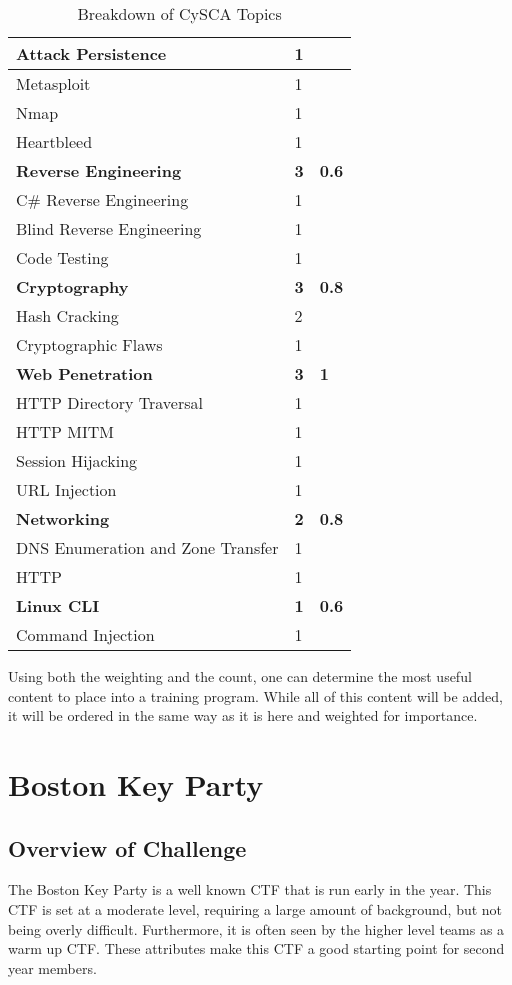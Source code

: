 \documentclass[a4paper,11pt]{report}
\begin{document}
\begin{table}[htb]
\begin{tabular}{| l | l | l |}
				\quad Attack Persistence & 1 & \\ \hline 
				\quad Metasploit & 1 & \\ \hline 
				\quad Nmap & 1 & \\ \hline 
				\quad Heartbleed & 1 & \\ \hline
				\textbf{Reverse Engineering} & \textbf{3} & \textbf{0.6}\\ \hline 
				\quad C\# Reverse Engineering & 1 & \\ \hline
				\quad Blind Reverse Engineering & 1 & \\ \hline 
				\quad Code Testing & 1 & \\ \hline 
				\textbf{Cryptography} & \textbf{3} & \textbf{0.8} \\ \hline 
				\quad Hash Cracking & 2 & \\ \hline
				\quad Cryptographic Flaws & 1 & \\ \hline 
				\textbf{Web Penetration} & \textbf{3} & \textbf{1} \\ \hline
				\quad HTTP Directory Traversal & 1 & \\ \hline
				\quad HTTP MITM & 1 & \\ \hline
				\quad Session Hijacking & 1 & \\ \hline
				\quad URL Injection & 1 & \\ \hline
				\textbf{Networking} & \textbf{2} & \textbf{0.8}\\ \hline
				\quad DNS Enumeration and Zone Transfer & 1 & \\ \hline 
				\quad HTTP & 1 & \\ \hline 
				\textbf{Linux CLI} & \textbf{1} &\textbf{0.6} \\ \hline
				\quad Command Injection & 1 & \\ \hline 
			\end{tabular}
			\caption{Breakdown of CySCA Topics}
			\label{tab:CySEC Breakdown}
		\end{table}
		Using both the weighting and the count, one can determine the most useful content to place into a training program. 
		While all of this content will be added, it will be ordered in the same way as it is here and weighted for importance. 

\chapter{Boston Key Party}
	\section{Overview of Challenge}
		The Boston Key Party is a well known CTF that is run early in the year. 
		This CTF is set at a moderate level, requiring a large amount of background, but not being overly difficult. 
		Furthermore, it is often seen by the higher level teams as a warm up CTF. 
		These attributes make this CTF a good starting point for second year members. 
\end{document}
